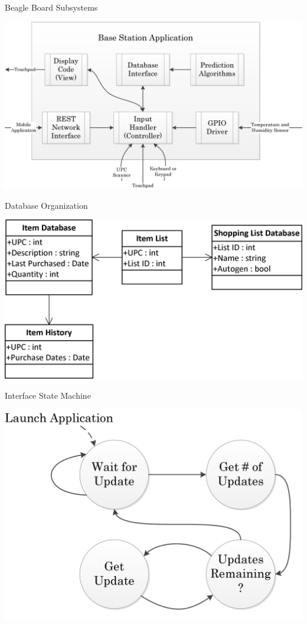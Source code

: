 \documentclass[t]{beamer}
\begin{document}
\begin{frame}{Beagle Board Subsystems}
\begin{center}
\includegraphics[scale=0.65]{../Graphics/BaseStation}
\end{center}
\end{frame}

\begin{frame}{Database Organization}
\begin{center}
\includegraphics[scale=1.0]{../Graphics/Databases}
\end{center}
\end{frame}

\begin{frame}{Interface State Machine}
\begin{center}
\includegraphics[scale=0.7]{../Graphics/StateMachine}
\end{center}
\end{frame}
\end{document}
